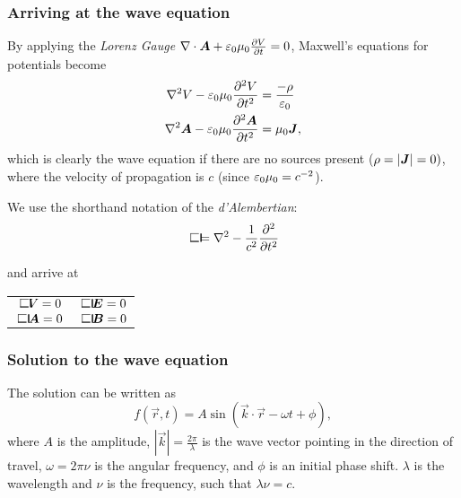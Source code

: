     \subsubsection*{Arriving at the wave equation}
        By applying the \textit{Lorenz Gauge} $\nabla\cdot\bm{A} + \varepsilon_0\mu_0\frac{\partial V}{\partial t} = 0$, 
        Maxwell's equations for potentials become 
        \begin{align}
            \label{Maxwells for potentials 1}
            \nabla^2V - \varepsilon_0\mu_0\frac{\partial^2V}{\partial t^2} &= \frac{-\rho}{\varepsilon_0}\\
            \nabla^2\bm{A} - \varepsilon_0\mu_0\frac{\partial^2\bm{A}}{\partial t^2} &= \mu_0\bm{J},
            \label{Maxwells for potentials 2}
        \end{align}
        which is clearly the wave equation if there are no sources present ($\rho = |\bm{J}| = 0)$, 
        where the velocity of propagation is $c$ (since $\varepsilon_0\mu_0 = c^{-2}$).

        We use the shorthand notation of the \textit{d'Alembertian}: 
        \begin{equation*}
            \dalambert = \nabla^2 - \frac{1}{c^2}\frac{\partial^2}{\partial t^2}
        \end{equation*}

        and arrive at
        \begin{center}
            \begin{tabular}{ c|c }
                $\dalambert V = 0$&$ \dalambert\,\E = 0$\\
                $\dalambert\,\vec{A} = 0 $&$\dalambert\,\B = 0$
            \end{tabular}
        \end{center}
    \subsubsection{Solution to the wave equation}
        The solution  can be written as
        \begin{equation*}
            f(\vec{r}, t) = A\sin\left(\vec{k}\cdot\vec{r} - \omega t + \phi\right),
        \end{equation*}
        where $A$ is the amplitude, $|\vec{k}| = \frac{2\pi}{\lambda}$ is the wave vector pointing in the direction of travel, 
        $\omega = 2\pi\nu$ is the angular frequency, and $\phi$ is an initial phase shift. 
        $\lambda$ is the wavelength and $\nu$ is the frequency, such that
        $\lambda\nu = c$.


